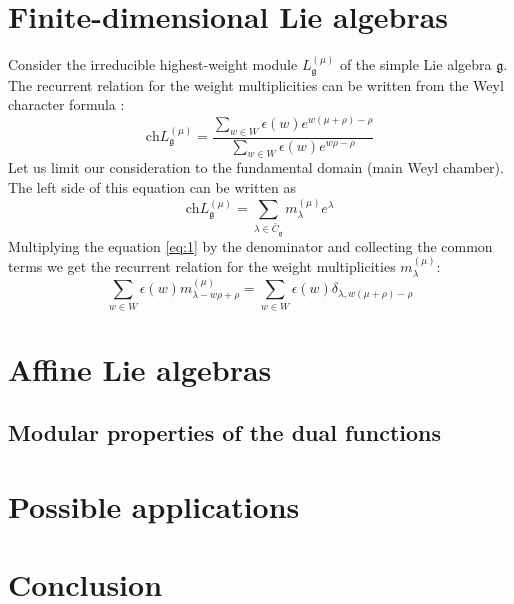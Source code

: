 \documentclass[a4paper,12pt]{article}
\theoremstyle{definition} \newtheorem{Def}{Definition}
\begin{document}
\section{Finite-dimensional Lie algebras}
\label{sec:finite-dimens-lie}
Consider the irreducible highest-weight module $L^{(\mu)}_{\mathfrak{g}}$ of the simple Lie algebra $\mathfrak{g}$. 
The recurrent relation for the weight multiplicities can be written from the Weyl character formula \cite{lyakhovsky1996rra}:
\begin{equation}
  \label{eq:1}
  \mathrm{ch} L^{(\mu)}_{\mathfrak{g}}=\frac{\sum_{w\in W}\epsilon(w) e^{w(\mu+\rho)-\rho}}{\sum_{w\in W}\epsilon(w) e^{w \rho -\rho}}
\end{equation}
Let us limit our consideration to the fundamental domain (main Weyl chamber). The left side of this equation can be written as
\begin{equation}
  \label{eq:2}
   \mathrm{ch} L^{(\mu)}_{\mathfrak{g}}=\sum_{\lambda\in \bar{C}_{\mathfrak{g}}} m^{(\mu)}_{\lambda} e^{\lambda}
\end{equation}
Multiplying the equation \eqref{eq:1} by the denominator  and collecting the common terms we get the recurrent relation for the weight multiplicities $m^{(\mu)}_{\lambda}$:
\begin{equation}
  \label{eq:3}
  \sum_{w\in W} \epsilon(w) m^{(\mu)}_{\lambda-w\rho+\rho}=\sum_{w\in W}\epsilon(w) \delta_{\lambda,w(\mu+\rho)-\rho}
\end{equation}
\section{Affine Lie algebras}
\label{sec:affine-lie-algebras}

\subsection{Modular properties of the dual functions}
\label{sec:modul-prop-dual}

\section{Possible applications}
\label{sec:poss-appl}

\section{Conclusion}
\label{sec:conclusion}



{}

\end{document}
